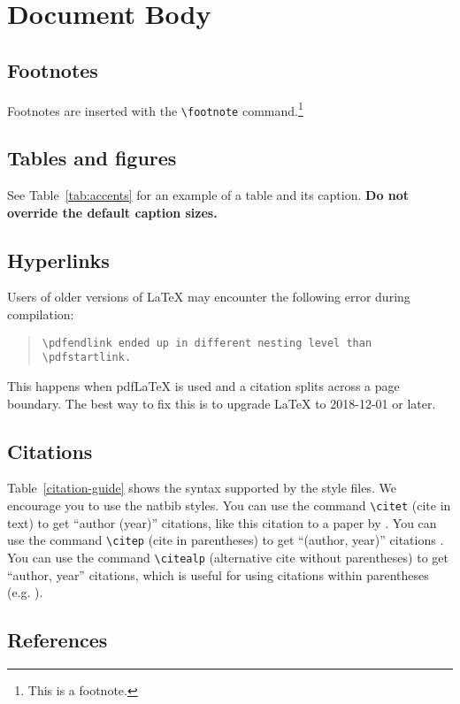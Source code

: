 \documentclass[11pt]{article}
\begin{document}
\section{Document Body}

\subsection{Footnotes}

Footnotes are inserted with the \verb|\footnote| command.\footnote{This is a footnote.}

\subsection{Tables and figures}

See Table~\ref{tab:accents} for an example of a table and its caption.
\textbf{Do not override the default caption sizes.}

\subsection{Hyperlinks}

Users of older versions of \LaTeX{} may encounter the following error during compilation: 
\begin{quote}
\tt\verb|\pdfendlink| ended up in different nesting level than \verb|\pdfstartlink|.
\end{quote}
This happens when pdf\LaTeX{} is used and a citation splits across a page boundary. The best way to fix this is to upgrade \LaTeX{} to 2018-12-01 or later.

\subsection{Citations}



Table~\ref{citation-guide} shows the syntax supported by the style files.
We encourage you to use the natbib styles.
You can use the command \verb|\citet| (cite in text) to get ``author (year)'' citations, like this citation to a paper by \citet{Gusfield:97}.
You can use the command \verb|\citep| (cite in parentheses) to get ``(author, year)'' citations \citep{Gusfield:97}.
You can use the command \verb|\citealp| (alternative cite without parentheses) to get ``author, year'' citations, which is useful for using citations within parentheses (e.g. \citealp{Gusfield:97}).

\subsection{References}
\end{document}

